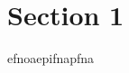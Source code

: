 \documentclass[furthertopics.tex]{subfile} %
\begin{document}
 
\section{Section 1}
 
 efnoaepifnapfna
 
\end{document}
